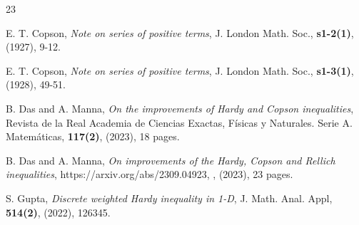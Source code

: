 \documentclass[12pt]{amsart}
\theoremstyle{definition}
\theoremstyle{plain}
\theoremstyle{definition}
\numberwithin{equation}{section}
\begin{document}
\begin{thebibliography}{23}


         {\sc E. T. Copson},
         {\it Note on series of positive terms},
         {J. London Math. Soc.}, {\bf s1-2(1)}, (1927), 9-12.

         {\sc E. T. Copson},
         {\it Note on series of positive terms},
         {J. London Math. Soc.}, {\bf s1-3(1)}, (1928), 49-51.

         {\sc B. Das and A. Manna},
         {\it On the improvements of Hardy and Copson inequalities},
         {Revista de la Real Academia de Ciencias Exactas, F\'{i}sicas y Naturales. Serie A. Matem\'{a}ticas}, {\bf 117(2)}, (2023), 18 pages.

         {\sc B. Das and A. Manna},
         {\it On improvements of the Hardy, Copson and Rellich inequalities},
         {https://arxiv.org/abs/2309.04923}, {\bf}, (2023), 23 pages.

%

%

         {\sc S. Gupta},
         {\it Discrete weighted Hardy inequality in 1-D},
         {J. Math. Anal. Appl}, {\bf 514(2)}, (2022), 126345.


\end{thebibliography}
\end{document}
